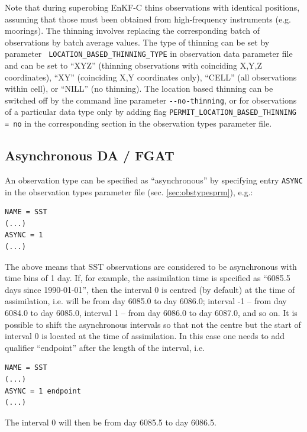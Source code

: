 \documentclass[11pt]{report}
\begin{document}
Note that during superobing EnKF-C thins observations with identical positions, assuming that those must been obtained from high-frequency instruments (e.g. moorings).
The thinning involves replacing the corresponding batch of observations by batch average values.
The type of thinning can be set by parameter \verb| LOCATION_BASED_THINNING_TYPE| in observation data parameter file and can be set to ``XYZ'' (thinning observations with coinciding X,Y,Z coordinates), ``XY'' (coinciding X,Y coordinates only), ``CELL'' (all observations within cell), or ``NILL'' (no thinning).
The location based thinning can be switched off by the command line parameter \verb|--no-thinning|, or for observations of a particular data type only by adding flag \verb|PERMIT_LOCATION_BASED_THINNING = no| in the corresponding section in the observation types parameter file.

\subsection{Asynchronous DA / FGAT}
\label{sec:async}

An observation type can be specified as ``asynchronous'' by specifying entry \verb|ASYNC| in the observation types parameter file (sec. \ref{sec:obstypesprm}), e.g.:
\begin{Verbatim}[frame=single,fontsize=\footnotesize]
NAME = SST
(...)
ASYNC = 1
(...)
\end{Verbatim}
The above means that SST observations are considered to be asynchronous with time bins of 1 day.
If, for example, the assimilation time is specified as ``6085.5 days since 1990-01-01'', then the interval 0 is centred (by default) at the time of assimilation, i.e. will be from day 6085.0 to day 6086.0; interval -1 -- from day 6084.0 to day 6085.0, interval 1 -- from day 6086.0 to day 6087.0, and so on.
It is possible to shift the asynchronous intervals so that not the centre but the start of interval 0 is located at the time of assimilation.
In this case one needs to add qualifier ``endpoint'' after the length of the interval, i.e.
\begin{Verbatim}[frame=single,fontsize=\footnotesize]
NAME = SST
(...)
ASYNC = 1 endpoint
(...)
\end{Verbatim}
The interval 0 will then be from day 6085.5 to day 6086.5.
\end{document}
